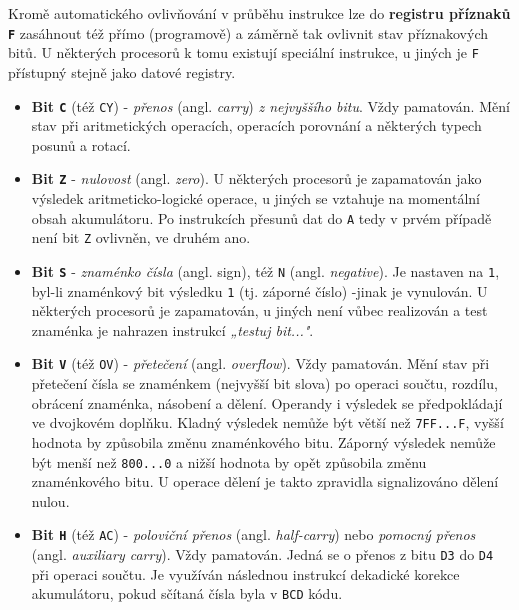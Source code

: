         Kromě automatického ovlivňování v průběhu instrukce lze do \textbf{registru příznaků 
        \texttt{F}} zasáhnout též přímo (programově) a záměrně tak ovlivnit stav příznakových bitů. 
        U některých procesorů k tomu existují speciální instrukce, u jiných je \texttt{F} přístupný 
        stejně jako datové registry.
        \begin{itemize}[noitemsep]
          \item \textbf{Bit \texttt{C}} (též \texttt{CY}) - \emph{přenos} (angl. \emph{carry})  
                \emph{z nejvyššího bitu}. Vždy pamatován. Mění stav při aritmetických operacích, 
                operacích porovnání a některých typech posunů a rotací.
         
          \item \textbf{Bit \texttt{Z}} - \emph{nulovost} (angl. \emph{zero}). U některých      
                procesorů je  zapamatován jako výsledek aritmeticko-logické operace, u jiných se 
                vztahuje na momentální  obsah akumulátoru. Po instrukcích přesunů dat do \texttt{A} 
                tedy v prvém případě není bit \texttt{Z} ovlivněn, ve druhém ano.
        
          \item \textbf{Bit \texttt{S}} - \emph{znaménko čísla} (angl. sign), též \texttt{N} (angl. 
                \emph{negative}). Je nastaven na \texttt{1}, byl-li znaménkový bit výsledku 
                \texttt{1} (tj.  záporné číslo) -jinak je vynulován. U některých procesorů je 
                zapamatován, u jiných není vůbec realizován a test znaménka je nahrazen instrukcí 
                \emph{„testuj bit..."}.
        
          \item \textbf{Bit \texttt{V}} (též \texttt{OV}) - \emph{přetečení} (angl.   
                \emph{overflow}). Vždy pamatován. Mění stav při přetečení čísla se znaménkem 
                (nejvyšší bit slova) po operaci součtu, rozdílu, obrácení znaménka, násobení a 
                dělení. Operandy i výsledek se předpokládají ve dvojkovém doplňku. Kladný výsledek 
                nemůže být větší než \texttt{7FF...F}, vyšší hodnota by způsobila změnu 
                znaménkového bitu. Záporný výsledek nemůže být menší než \texttt{800...0} a 
                nižší hodnota by opět způsobila změnu znaménkového bitu. U operace dělení je takto 
                zpravidla signalizováno dělení nulou.
        
          \item \textbf{Bit \texttt{H}} (též \texttt{AC}) - \emph{poloviční přenos} (angl.  
                \emph{half-carry}) nebo \emph{pomocný přenos} (angl. \emph{auxiliary carry}). Vždy 
                pamatován. Jedná se o přenos z bitu \texttt{D3} do \texttt{D4} při operaci součtu. 
                Je využíván následnou instrukcí dekadické korekce akumulátoru, pokud sčítaná čísla 
                byla v \texttt{BCD} kódu.
        

\end{itemize}
